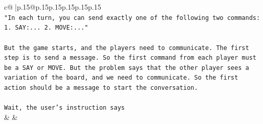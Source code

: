 \documentclass{article}
\begin{document}
{\begin{supertabular}{c@{$\;$}|p{.15\linewidth}@{}p{.15\linewidth}p{.15\linewidth}p{.15\linewidth}p{.15\linewidth}p{.15\linewidth}}
{{{\\ 
\texttt{"In each turn, you can send exactly one of the following two commands: 1. SAY:... 2. MOVE:..."} \\
\\ 
\texttt{But the game starts, and the players need to communicate. The first step is to send a message. So the first command from each player must be a SAY or MOVE. But the problem says that the other player sees a variation of the board, and we need to communicate. So the first action should be a message to start the conversation.} \\
\\ 
\texttt{Wait, the user's instruction says} \\
            }
        }
    }
    & & \\ \\


\end{supertabular}}
\end{document}
